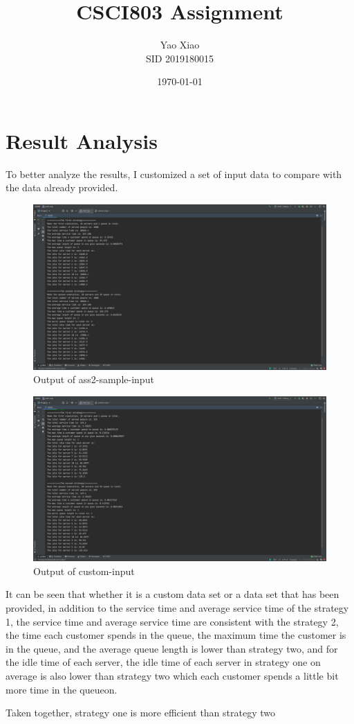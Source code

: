 \documentclass{article}
\title{CSCI803 Assignment}
\author{Yao Xiao \\ SID 2019180015}
\date{\today}
\begin{document}
\maketitle

\section*{Result Analysis}
To better analyze the results, I customized a set of input data to compare with the data already provided.

\begin{figure}[H]
    \caption{Output of ass2-sample-input}
    \includegraphics[width=1\textwidth]{Fig1}
\end{figure}

\begin{figure}[H]
    \caption{Output of custom-input}
    \includegraphics[width=1\textwidth]{Fig2}
\end{figure}


It can be seen that whether it is a custom data set or a data set that has been provided, in addition to the service time and average service time of the strategy 1, the service time and average service time are consistent with the strategy 2, the time each customer spends in the queue, the maximum time the customer is in the queue, and the average queue length is lower than strategy two, and for the idle time of each server, the idle time of each server in strategy one on average is also lower than strategy two which each customer spends a little bit more time in the queueon.

Taken together, strategy one is more efficient than strategy two
\end{document}
